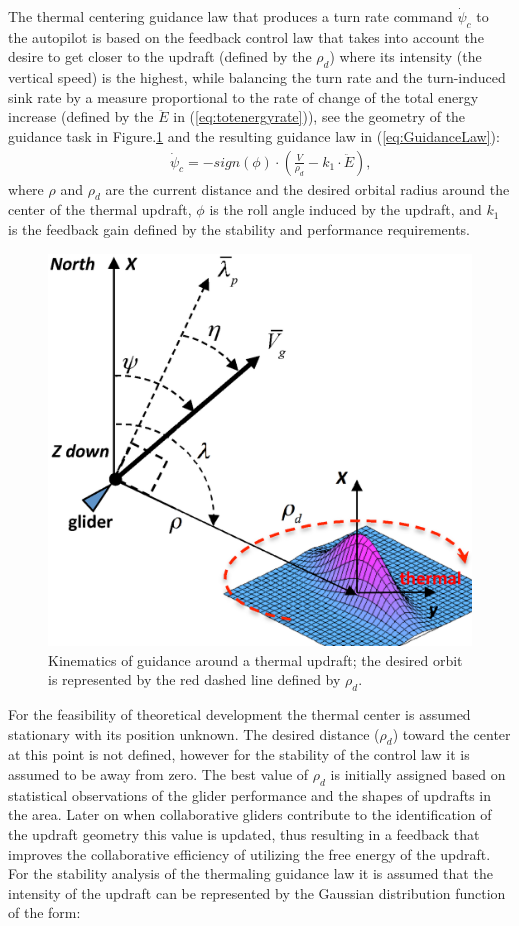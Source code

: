 \documentclass{ifacconf}
\begin{document}
The thermal centering guidance law that produces a turn rate command $\dot{\psi}_{c}$ to the autopilot is based on the feedback control law that takes into account the desire to get closer to the updraft (defined by the $\rho_d$) where its intensity (the vertical speed) is the highest, while balancing the turn rate and the turn-induced sink rate by a measure proportional to the rate of change of the total energy increase (defined by the $\ddot{E}$ in (\ref{eq:totenergyrate})), see the geometry of the guidance task in Figure.\ref{fig:ThermaG} and the resulting guidance law in (\ref{eq:GuidanceLaw}):
\begin{eqnarray}
    && \dot{\psi}_{c}=-sign(\phi) \cdot (\frac{V}{\rho_d}-k_1 \cdot \ddot{E}),
    \label{eq:GuidanceLaw}
\end{eqnarray}
where $\rho$ and $\rho_d$ are the current distance and the desired orbital radius around the center of the thermal updraft, $\phi$ is the roll angle induced by the updraft, and $k_1$ is the feedback gain defined by the stability and performance requirements.
\begin{figure}[thpb]
  \centering
  \includegraphics[scale=0.3]{Figures/ThermalG.eps}
  \caption{Kinematics of guidance around a thermal updraft; the desired orbit is represented by the red dashed line defined by $\rho_d$.}
  \label{fig:ThermaG}
\end{figure}
For the feasibility of theoretical development the thermal center is assumed stationary with its position unknown. The desired distance ($\rho_d$) toward the center at this point is not defined, however for the stability of the control law it is assumed to be away from zero. The best value of $\rho_d$ is initially assigned based on statistical observations of the glider performance and the shapes of updrafts in the area. Later on when collaborative gliders contribute to the identification of the updraft geometry this value is updated, thus resulting in a feedback that improves the collaborative efficiency of utilizing the free energy of the updraft. For the stability analysis of the thermaling guidance law it is assumed that the intensity of the updraft can be represented by the Gaussian distribution function of the form:
\end{document}
